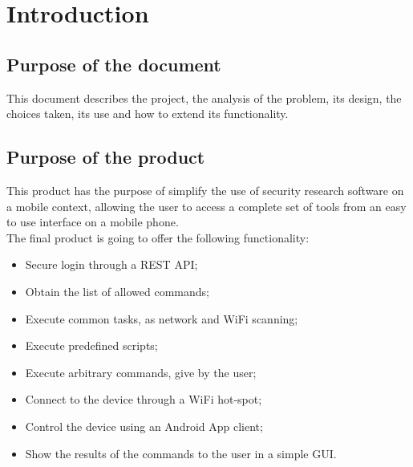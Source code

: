 \documentclass[../PiTest.tex]{subfiles}
\begin{document}
\section{Introduction}

	\subsection{Purpose of the document}
	This document describes the project, the analysis of the problem, its design, the choices taken, its use and how to extend its functionality.
	
	\subsection{Purpose of the product}
	This product has the purpose of simplify the use of security research software on a mobile context, allowing the user to access a complete set of tools from an easy to use interface on a mobile phone.\\
	The final product is going to offer the following functionality:
	\begin{itemize}
		\item Secure login through a REST API;
		\item Obtain the list of allowed commands;
		\item Execute common tasks, as network and WiFi scanning;
		\item Execute predefined scripts;
		\item Execute arbitrary commands, give by the user;
		\item Connect to the device through a WiFi hot-spot;
		\item Control the device using an Android App client;
		\item Show the results of the commands to the user in a simple GUI.
	\end{itemize}
	
\end{document}
